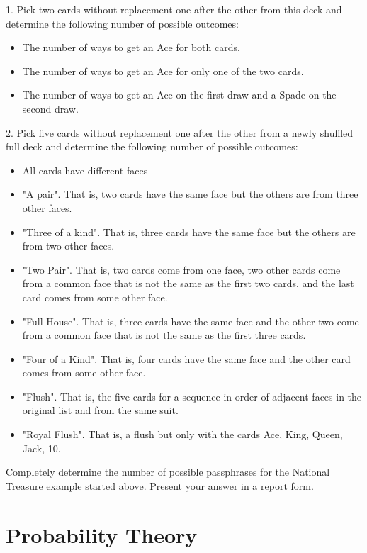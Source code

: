 \documentclass[10pt,]{book}
\theoremstyle{plain}
\theoremstyle{definition}
\theoremstyle{definition}
\theoremstyle{definition}
\numberwithin{equation}{section}
\begin{document}
1.  Pick two cards without replacement one after the other from this deck and determine the following number of possible outcomes:
\leavevmode%
\begin{itemize}[label=\textbullet]
\item{}The number of ways to get an Ace for both cards.%
\item{}The number of ways to get an Ace for only one of the two cards.%
\item{}The number of ways to get an Ace on the first draw and a Spade on the second draw.%
\end{itemize}

2.  Pick five cards without replacement one after the other from a newly shuffled full deck and determine the following number of possible outcomes:
\leavevmode%
\begin{itemize}[label=\textbullet]
\item{}All cards have different faces%
\item{}"A pair". That is, two cards have the same face but the others are from three other faces.%
\item{}"Three of a kind".  That is, three cards have the same face but the others are from two other faces.%
\item{}"Two Pair". That is, two cards come from one face, two other cards come from a common face that is not the same as the first two cards, and the last card comes from some other face.%
\item{}"Full House". That is, three cards have the same face and the other two come from a common face that is not the same as the first three cards.%
\item{}"Four of a Kind". That is, four cards have the same face and the other card comes from some other face.%
\item{}"Flush". That is, the five cards for a sequence in order of adjacent faces in the original list and from the same suit.%
\item{}"Royal Flush". That is, a flush but only with the cards {Ace, King, Queen, Jack, 10}.%
\end{itemize}

%
\par
Completely determine the number of possible passphrases for the National Treasure example started above. Present your answer in a report form.%
\typeout{************************************************}
\typeout{************************************************}
\chapter[{Probability Theory}]{Probability Theory}\label{ProbabilityGeneralities}
\typeout{************************************************}
\typeout{************************************************}
\end{document}
